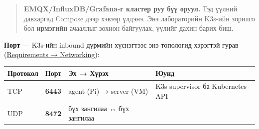 \begin{quote}
\textbf{EMQX/InfluxDB/Grafana-г кластер руу бүү оруул.} Тэд үүлний давхаргад Compose дээр хэвээр үлдэнэ. Энэ лабораторийн K3s-ийн зорилго бол \textbf{ирмэгийн} ачааллыг зохион байгуулах, үүлийг дахин барих биш.
\end{quote}

\textbf{Порт} --- K3s-ийн inbound дүрмийн хүснэгтээс энэ топологид хэрэгтэй гурав (\href{https://docs.k3s.io/installation/requirements\#networking}{Requirements → Networking}):

\begingroup\scriptsize\begin{longtable}[]{@{}llll@{}}
\toprule
\begin{minipage}[b]{0.22\columnwidth}\raggedright
Протокол\strut
\end{minipage} & \begin{minipage}[b]{0.22\columnwidth}\raggedright
Порт\strut
\end{minipage} & \begin{minipage}[b]{0.22\columnwidth}\raggedright
Эх → Хүрэх\strut
\end{minipage} & \begin{minipage}[b]{0.22\columnwidth}\raggedright
Юунд\strut
\end{minipage}\tabularnewline
\midrule
\endhead
\begin{minipage}[t]{0.22\columnwidth}\raggedright
TCP\strut
\end{minipage} & \begin{minipage}[t]{0.22\columnwidth}\raggedright
\textbf{6443}\strut
\end{minipage} & \begin{minipage}[t]{0.22\columnwidth}\raggedright
agent (Pi) → server (VM)\strut
\end{minipage} & \begin{minipage}[t]{0.22\columnwidth}\raggedright
K3s supervisor ба Kubernetes API\strut
\end{minipage}\tabularnewline
\begin{minipage}[t]{0.22\columnwidth}\raggedright
UDP\strut
\end{minipage} & \begin{minipage}[t]{0.22\columnwidth}\raggedright
\textbf{8472}\strut
\end{minipage} & \begin{minipage}[t]{0.22\columnwidth}\raggedright
бүх зангилаа ↔ бүх зангилаа\strut
\end{minipage} & \begin{minipage}[t]{0.22\columnwidth}\raggedright

\end{minipage}
\end{longtable}
